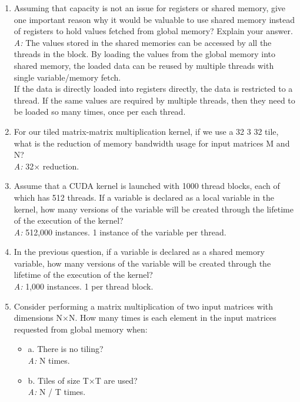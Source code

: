 \begin{enumerate}
      \item Assuming that capacity is not an issue for registers or shared memory, give one important reason why it would be valuable to use shared memory instead of registers to hold values fetched from global memory? Explain your answer.
            \\\textsl{A:} The values stored in the shared memories can be accessed by all the threads in the block. By loading the values from the global memory into shared memory, the loaded data can be reused by multiple threads with single variable/memory fetch.\\ If the data is directly loaded into registers directly, the data is restricted to a thread. If the same values are required by multiple threads, then they need to be loaded so many times, once per each thread.

      \item For our tiled matrix-matrix multiplication kernel, if we use a 32 3 32 tile, what is the reduction of memory bandwidth usage for input matrices M and N?
            \\\textsl{A:} 32$\times$ reduction.
      \item Assume that a CUDA kernel is launched with 1000 thread blocks, each of which has 512 threads. If a variable is declared as a local variable in the kernel, how many versions of the variable will be created through the lifetime of the execution of the kernel?
            \\\textsl{A:} 512,000 instances. 1 instance of the variable per thread.
      \item In the previous question, if a variable is declared as a shared memory variable, how many versions of the variable will be created through the lifetime of the execution of the kernel?
            \\\textsl{A:} 1,000 instances. 1 per thread block.
      \item Consider performing a matrix multiplication of two input matrices with dimensions N$\times$N. How many times is each element in the input matrices requested from global memory when:
            \begin{itemize}
                  \item a. There is no tiling?
                        \\ \textsl{A:} N times.
                  \item b. Tiles of size T$\times$T are used?
                        \\ \textsl{A: } N / T times.
            \end{itemize}


\end{enumerate}
